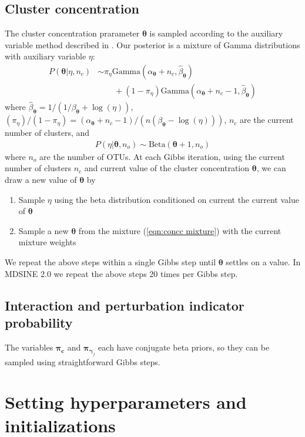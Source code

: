 \documentclass{article}
\newcommand{\Gammadist}{\text{Gamma}}
\newcommand{\Betadist}{\text{Beta}}
\renewcommand{\c}{\mathbf{c}}
\newcommand{\concc}{\mathbf{\theta}}
\newcommand{\probc}{\mathbf{\pi_{\c}}}
\newcommand{\pert}{\mathbf{\gamma}_j}
\newcommand{\probpert}{\mathbf{\pi}_{\pert}}
\begin{document}
\subsection{Cluster concentration}
The cluster concentration prarameter $\concc$ is sampled according to the auxiliary variable method described in \cite{cite:escobarandwest1995}. Our posterior is a mixture of Gamma distributions with auxiliary variable $\eta$:
\begin{align}
  \label{eqn:concc mixture}
  P(\concc | \eta , n_c) & \sim \pi_\eta \Gammadist(\alpha_\concc + n_c, \hat{\beta}_\concc) \\
  & \quad \quad + (1-\pi_\eta) \Gammadist (\alpha_\concc + n_c - 1, \hat{\beta}_\concc) \nonumber
\end{align}
where $\hat{\beta}_\concc = 1/(1/\beta_\concc + \log(\eta))$, $(\pi_\eta)/(1-\pi_\eta) = (\alpha_\concc + n_c -1)/(n(\beta_\concc - \log(\eta)))$, $n_c$ are the current number of clusters, and
\begin{align}
  P(\eta | \concc, n_o) \sim \Betadist(\concc + 1, n_o)
\end{align}
where $n_o$ are the number of OTUs. At each Gibbs iteration, using the current number of clusters $n_c$ and current value of the cluster concentration $\concc$, we can draw a new value of $\concc$ by
\begin{enumerate}
  \item Sample $\eta$ using the beta distribution conditioned on current the current value of $\concc$
  \item Sample a new $\concc$ from the mixture (\ref{eqn:concc mixture}) with the current mixture weights
\end{enumerate}
We repeat the above steps within a single Gibbs step until $\concc$ settles on a value. In MDSINE 2.0 we repeat the above steps 20 times per Gibbs step.


\subsection{Interaction and perturbation indicator probability}
The variables $\probc$ and $\probpert$ each have conjugate beta priors, so they can be sampled using straightforward Gibbs steps.

\section{Setting hyperparameters and initializations}
\label{section:setting hyperparameters and initializations}
\end{document}
